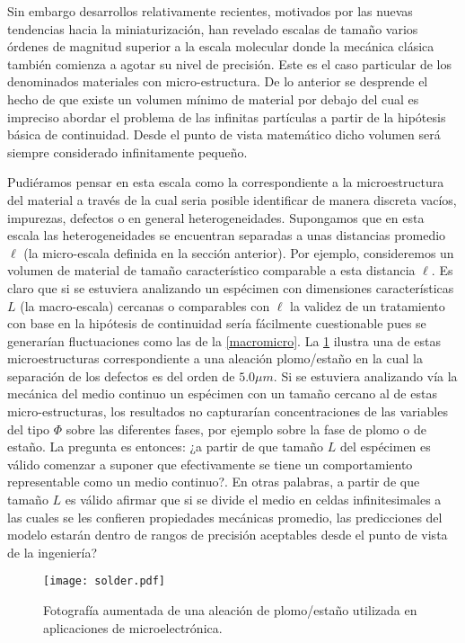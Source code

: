 \documentclass[../notas medios.tex]{subfiles}
\begin{document}
Sin embargo desarrollos relativamente recientes, motivados por las nuevas tendencias hacia la miniaturización, han revelado escalas de tamaño varios órdenes de magnitud superior a la escala molecular donde la mecánica clásica también comienza a agotar su nivel de precisión.  Este es el caso particular de los denominados materiales con micro-estructura.  De lo anterior se desprende el hecho de que existe un volumen mínimo de material por debajo del cual es impreciso abordar el problema de las infinitas partículas a partir de la hipótesis básica de continuidad.  Desde el punto de vista matemático dicho volumen será siempre considerado infinitamente pequeño.

Pudiéramos pensar en esta escala como la correspondiente a la microestructura
del material a través de la cual seria posible identificar de manera discreta
vacíos, impurezas, defectos o en general heterogeneidades.  Supongamos que en esta escala las heterogeneidades se encuentran separadas a unas distancias promedio $\ell$  (la micro-escala definida en la sección anterior).  Por ejemplo, consideremos un volumen de material de tamaño característico comparable a esta distancia $\ell$.  Es claro que si se estuviera analizando un espécimen con dimensiones características $L$ (la macro-escala) cercanas o comparables con $\ell$ la validez de un tratamiento con base en la hipótesis de continuidad sería fácilmente cuestionable pues se generarían fluctuaciones como las de la \cref{macromicro}.  La \cref{solder} ilustra una de estas microestructuras correspondiente a una aleación plomo/estaño en la cual la separación de los defectos es del orden de $5.0 \mu m$.  Si se estuviera analizando vía la mecánica del medio continuo un espécimen con un tamaño cercano al de estas micro-estructuras, los resultados no capturarían concentraciones de las variables del tipo $\Phi$ sobre las diferentes fases, por ejemplo sobre la fase de plomo o de estaño.  La pregunta es entonces: ¿a partir de que tamaño $L$ del espécimen es válido comenzar a suponer que efectivamente se tiene un comportamiento representable como un medio continuo?.  En otras palabras, a partir de que tamaño $L$ es válido afirmar que si se divide el medio en celdas infinitesimales a las cuales se les confieren propiedades mecánicas promedio, las predicciones del modelo estarán dentro de rangos de precisión aceptables desde el punto de vista de la ingeniería?

\begin{figure}[H]
\centering
	\texttt{[image: solder.pdf]}
	\caption{Fotografía aumentada de una aleación de plomo/estaño utilizada en aplicaciones de microelectrónica.}
	\label{solder}
\end{figure}
\end{document}
